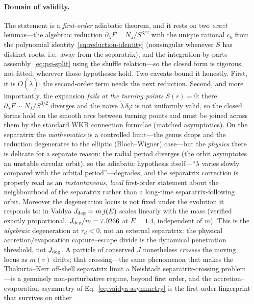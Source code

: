 \documentclass[12pt]{iopart}
\begin{document}
\paragraph{Domain of validity.} The statement is a \emph{first-order} adiabatic
theorem, and it rests on two \emph{exact} lemmas---the algebraic reduction
$\partial_\lambda F=N_\lambda/S^{3/2}$ with the unique rational $c_k$ from the
polynomial identity~\eqref{eq:reduction-identity} (nonsingular whenever $S$ has
distinct roots, i.e.\ away from the separatrix), and the integration-by-parts
assembly~\eqref{eq:psi-split} using the shuffle relation---so the closed form is
rigorous, not fitted, wherever those hypotheses hold. Two caveats bound it honestly.
First, it is $O(\dot\lambda)$: the second-order term needs the next reduction.
Second, and more importantly, the expansion \emph{fails at the turning points}
$S(r)=0$: there $\partial_\lambda F\sim N_\lambda/S^{3/2}$ diverges and the na\"ive
$\dot\lambda\,\delta\varphi$ is not uniformly valid, so the closed forms hold on the
smooth arcs between turning points and must be joined across them by the standard WKB
connection formulae (matched asymptotics). On the separatrix the \emph{mathematics}
is a controlled limit---the genus drops and the reduction degenerates to the elliptic
(Bloch--Wigner) case---but the \emph{physics} there is delicate for a separate reason:
the radial period diverges (the orbit asymptotes an unstable circular orbit), so the
adiabatic hypothesis itself---``$\lambda$ varies slowly compared with the orbital
period''---degrades, and the separatrix correction is properly read as an
\emph{instantaneous, local} first-order statement about the neighbourhood of the
separatrix rather than a long-time separatrix-following orbit. Moreover the degeneration
locus is not fixed under the evolution it responds to: in Vaidya
$J_{\rm deg}=m\,j(E)$ scales linearly with the mass (verified exactly proportional,
$J_{\rm deg}/m=7.0266$ at $E=1.4$, independent of $m$). This is the \emph{algebraic}
degeneration at $r_d<0$, not an external separatrix: the physical accretion$/$evaporation
capture--escape divide is the dynamical penetration threshold, not $J_{\rm deg}$. A
particle of conserved $J$ nonetheless \emph{crosses} the moving locus as $m(v)$ drifts;
that crossing---the same phenomenon that makes the Thakurta--Kerr off-shell separatrix
limit a Neishtadt separatrix-crossing problem---is a genuinely non-perturbative regime,
beyond first order, and the accretion--evaporation asymmetry of
Eq.~\eqref{eq:vaidya-asymmetry} is the first-order fingerprint that survives on either
\end{document}
